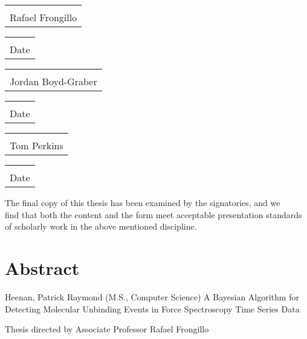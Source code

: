 \documentclass[%
  aip,12pt,tightenlines,
  amsthm,
 amsmath,amssymb
]{article}
\makeatletter
\newcommand{\firstp}[0]{}
\newcommand{\titledate}[2][2in]{%
  \noindent%
  \begin{tabular}{@{}p{#1}@{}}
    \\ \hline \\[-.75\normalbaselineskip]
    #2
  \end{tabular} \hspace{1in}
  \begin{tabular}{@{}p{#1}@{}}
    \\ \hline \\[-.75\normalbaselineskip]
    Date
  \end{tabular}
}
\newcommand{\name}[0]{FEATHER}
\newcommand{\bc}[0]{Bhattacharyya}
\newcommand{\acronym}[0]{\textbf{F}orce \textbf{E}xtension \textbf{A}nalysis using a \textbf{T}estable \textbf{H}ypothesis for \textbf{E}vent \textbf{R}ecognition}
\newcommand{\TitleName}[0]{A Bayesian Algorithm for Detecting Molecular Unbinding Events in Force Spectroscopy Time Series Data}
\newcommand{\singlemol}[0]{SMFS}
\makeatother
\begin{document}
\begin{center}

\titledate{Rafael Frongillo}

\leavevmode \newline  \newline

\titledate{Jordan Boyd-Graber}

\leavevmode \newline  \newline

\titledate{Tom Perkins}

\leavevmode \newline \newline \newline 
The final copy of this thesis has been examined by the signatories, and we\\
find that both the content and the form meet acceptable presentation standards\\
of scholarly work in the above mentioned discipline.

\end{center}


\clearpage


\section{Abstract}

\noindent Heenan, Patrick Raymond (M.S., Computer Science) \newline
\hangindent=0.75cm \TitleName{} \par
\noindent Thesis directed by Associate Professor Rafael Frongillo \newline


\begin{abstract}
\firstp In Single Molecule Force Spectroscopy (\singlemol{}) experiments, mechanical forces are applied to individual biomolecules via a probe such as an optical trap or an atomic force microscope (AFM). In \singlemol{} unfolding experiments, the molecule of interest is pulled apart and force is measured as a function of probe position relative to a relaxed state. Although unfolding experiments are capable of measuring a wide class of molecular phenomena, interpreting \singlemol{} data is hindered by identifying where unfolding events occur in the presence of noise. This paper introduces a new algorithm, \name{} (\acronym), for identifying the locations of molecular unfolding events. \name{} features an event detection error of 8nm, a 100-fold improvement relative to the best baseline used, and a \bc{} coefficient of 0.96, an improvement of 0.3 relative to the best baseline used, for the joint distribution of event loading rates and rupture forces. As a linear-time algorithm for reproducible event identification, \name{} improves the quality of analysis of \singlemol{} data.
\end{abstract}
\end{document}
